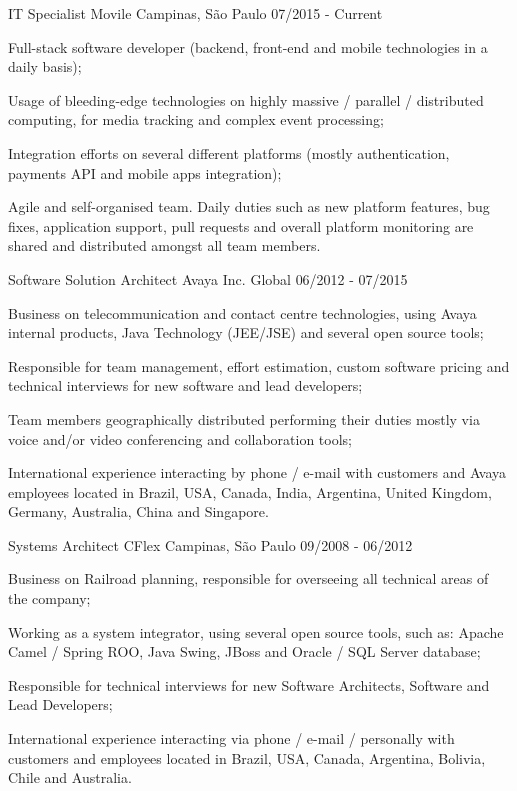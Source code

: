 
\begin{cventries}

\cventry
{IT Specialist}
{Movile}
{Campinas, São Paulo}
{07/2015 - Current}
{
\begin{cvitems}
\item Full-stack software developer (backend, front-end and mobile technologies in a daily basis);
\item Usage of bleeding-edge technologies on highly massive / parallel / distributed computing, for media tracking and complex event processing;
\item Integration efforts on several different platforms (mostly authentication, payments API and mobile apps integration);
\item Agile and self-organised team. Daily duties such as new platform features, bug fixes, application support, pull requests and overall platform monitoring are shared and distributed amongst all team members.
\end{cvitems}
}

\cventry
{Software Solution Architect}
{Avaya Inc.}
{Global}
{06/2012 - 07/2015}
{
\begin{cvitems}
\item Business on telecommunication and contact centre technologies, using Avaya internal products, Java Technology (JEE/JSE) and several open source tools;
\item Responsible for team management, effort estimation, custom software pricing and technical interviews for new software and lead developers;
\item Team members geographically distributed performing their duties mostly via voice and/or video conferencing and collaboration tools;
\item International experience interacting by phone / e-mail with customers and Avaya employees located in Brazil, USA, Canada, India, Argentina, United Kingdom, Germany, Australia, China and Singapore.
\end{cvitems}
}

\cventry
{Systems Architect}
{CFlex}
{Campinas, São Paulo}
{09/2008 - 06/2012}
{
\begin{cvitems}
\item Business on Railroad planning, responsible for overseeing all technical areas of the company;
\item Working as a system integrator, using several open source tools, such as: Apache Camel / Spring ROO, Java Swing, JBoss and Oracle / SQL Server database;
\item Responsible for technical interviews for new Software Architects, Software and Lead Developers;
\item International experience interacting via phone / e-mail / personally with customers and employees located in Brazil, USA, Canada, Argentina, Bolivia, Chile and Australia.
\end{cvitems}
}


\end{cventries}
